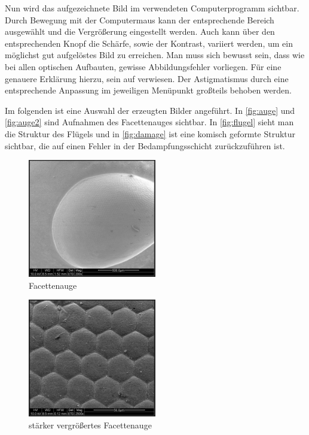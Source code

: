 \documentclass[12pt,english,ngerman]{scrartcl}
\begin{document}
Nun wird das aufgezeichnete Bild im verwendeten Computerprogramm sichtbar. Durch Bewegung mit der Computermaus kann 
der entsprechende Bereich ausgewählt und die Vergrößerung eingestellt werden. Auch kann über den entsprechenden Knopf die 
Schärfe, sowie der Kontrast, variiert werden, um ein möglichst gut aufgelöstes Bild zu erreichen. Man muss sich bewusst 
sein, dass wie bei allen
optischen Aufbauten, gewisse Abbildungsfehler vorliegen. Für eine genauere Erklärung hierzu, sein auf \cite{unterlagen} 
verwiesen. Der Astigmatismus durch eine entsprechende Anpassung im jeweiligen Menüpunkt großteils behoben werden.



Im folgenden ist eine Auswahl der erzeugten Bilder angeführt. In \autoref{fig:auge} und \autoref{fig:auge2} sind Aufnahmen
des Facettenauges sichtbar. In \autoref{fig:flugel} sieht man die Struktur des Flügels und in \autoref{fig:damage} ist eine
komisch geformte Struktur sichtbar, die auf einen Fehler in der Bedampfungsschicht zurückzuführen ist.

\begin{figure}[H]
	\begin{center}
		\includegraphics[width =0.5\textwidth]{./figures/auge.png}
	\end{center}
	\caption{Facettenauge}
    \label{fig:auge}
\end{figure}

\begin{figure}[H]
	\begin{center}
		\includegraphics[width =0.5\textwidth]{./figures/auge2.png}
	\end{center}
	\caption{stärker vergrößertes Facettenauge}
    \label{fig:auge2}
\end{figure}
\end{document}
